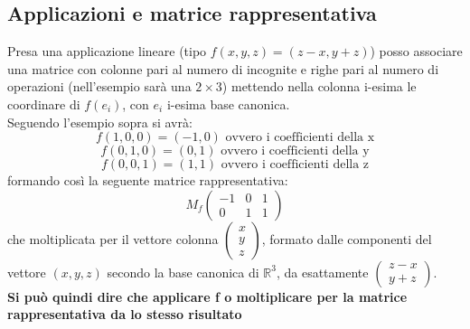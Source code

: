 \documentclass[a4paper,12pt, oneside]{book}
\begin{document}
\subsection{Applicazioni e matrice rappresentativa}
Presa una applicazione lineare (tipo $f(x,y,z)=(z-x,y+z)$) posso associare una matrice con colonne pari al numero di incognite e righe pari al numero di operazioni (nell'esempio sarà una $2\times 3$) mettendo nella colonna i-esima le coordinare di $f(e_i)$, con $e_i$ i-esima base canonica.\\ Seguendo l'esempio sopra si avrà:
$$f(1,0,0)=(-1,0) \mbox{ ovvero i coefficienti della x}$$
$$f(0,1,0)=(0,1) \mbox{ ovvero i coefficienti della y}$$
$$f(0,0,1)=(1,1) \mbox{ ovvero i coefficienti della z}$$
formando così la seguente matrice rappresentativa:
$$
M_f\left(\begin{matrix}
-1 & 0 & 1\\
0 & 1 & 1
\end{matrix}\right)
$$
che moltiplicata per il vettore colonna $
\left(\begin{matrix}
x\\
y\\
z
\end{matrix}\right)
$, formato dalle componenti del vettore $(x,y,z)$ secondo la base canonica di $\mathbb{R}^3$, da esattamente $\left(\begin{matrix}
z-x\\
y+z
\end{matrix}\right)
$.\\ \textbf{Si può quindi dire che applicare f o moltiplicare per la matrice rappresentativa da lo stesso risultato}
\end{document}
